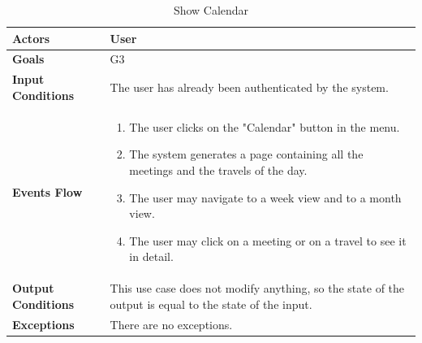 \begin{table}[H]
	\centering
	\def\arraystretch{1.5}
	\begin{tabular}{|p{7cm}|p{7cm}|}
		\hline
		\textbf{Actors}            & User		    \\ \hline
		\textbf{Goals}             & G3           \\ \hline
		\textbf{Input Conditions}  & The user has already been authenticated by the system.           \\ \hline
		\textbf{Events Flow}       & 
			\begin{enumerate}[topsep=0pt, leftmargin=*]
				\item The user clicks on the "Calendar" button in the menu.
				\item The system generates a page containing all the meetings and the travels of the day.
				\item The user may navigate to a week view and to a month view.
				\item The user may click on a meeting or on a travel to see it in detail.
			\end{enumerate}	           \\ \hline
		\textbf{Output Conditions} & This use case does not modify anything, so the state of the output is equal to the state of the input.           \\ \hline
		\textbf{Exceptions}        & There are no exceptions.           \\ \hline
	\end{tabular}
	\caption{Show Calendar}
\end{table}


